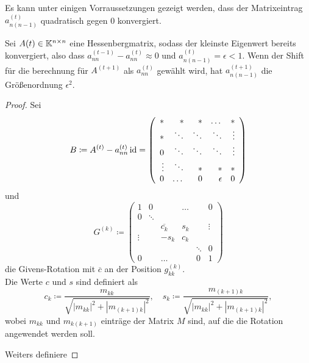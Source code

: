 \documentclass{article}
\begin{document}
Es kann unter einigen Vorraussetzungen gezeigt werden, dass der Matrixeintrag $a^{(t)}_{n(n-1)}$ quadratisch gegen 0 konvergiert.

\begin{theorem}
	Sei $A(t) \in \mathbb{K}^{n\times n}$ eine Hessenbergmatrix, sodass der kleinste Eigenwert bereits konvergiert, also dass $a^{(t-1)}_{nn} - a^{(t)}_{nn} \approx 0$ und $a^{(t)}_{n(n-1)} = \epsilon < 1$. Wenn der Shift für die berechnung für $A^{(t+1)}$ als $a^{(t)}_{nn}$ gewählt wird, hat $a^{(t+1)}_{n(n-1)}$ die Größenordnung $\epsilon^2$.
\end{theorem}
\begin{proof}
	Sei
	\begin{equation*}
		B \coloneqq A^{(t)} - a^{(t)}_{nn} \operatorname{id} = \left( \begin{array}{rrrrr}
			* & * &* &\dots & * \\
			* & \ddots & \ddots &\ddots & \vdots \\
			0 & \ddots &\ddots & \ddots &\vdots \\
			\vdots & \ddots & * & * & * \\
			0 & \dots & 0 & \epsilon & 0\\
		\end{array}\right)
	\end{equation*}
und
	\begin{equation*}
		G^{(k)} \coloneqq \left(\begin{array}{rrrrrr}
			1 & 0 & &\dots & & 0\\
			0 & \ddots & & & &\\
			 & & \overline{c_k} & s_k & &\vdots\\
			 \vdots & & -s_k & c_k & &\\
			 & & & & \ddots & 0\\
			 0 & & \dots & & 0 & 1
		\end{array}\right)
	\end{equation*}
	die Givens-Rotation mit $\overline{c}$ an der Position $g^{(k)}_{kk}$. \\
	Die Werte $c$ und $s$ sind definiert als
	\begin{equation}
		c_k \coloneqq \frac{m_{kk}}{\sqrt{|m_{kk}|^2 + |m_{(k+1)k}|^2}} , \quad s_k \coloneqq \frac{m_{(k+1)k}}{\sqrt{|m_{kk}|^2 + |m_{(k+1)k}|^2}},
	\end{equation}
 	wobei $m_{kk}$ und $m_{k(k+1)}$ einträge der Matrix $M$ sind, auf die die Rotation angewendet werden soll.

	Weiters definiere


\end{proof}
\end{document}
